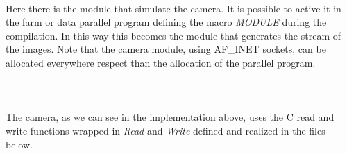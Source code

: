 
\ \\
Here there is the module that simulate the camera. It is possible to active it in the farm or data parallel program defining the macro \textit{MODULE} during the compilation. In this way this becomes the module that generates the stream of the images. Note that the camera module, using AF\_INET sockets, can be allocated everywhere respect than the allocation of the parallel program.
\ \\

\ \\
\ \\

\ \\
The camera, as we can see in the implementation above, uses the C read and write functions wrapped in \textit{Read} and \textit{Write} defined and realized in the files below.
\ \\

\ \\
\ \\

\ \\